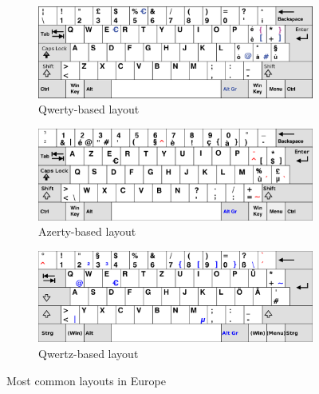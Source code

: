 \begin{figure}[H]
    \centering
    \begin{subfigure}[b]{0.3\textwidth}
        \includegraphics[width=\textwidth]{images/qwerty.png}
        \caption{Qwerty-based layout}
    \end{subfigure}
	 \begin{subfigure}[b]{0.3\textwidth}
        \includegraphics[width=\textwidth]{images/azerty.png}
        \caption{Azerty-based layout}
    \end{subfigure} 
    \begin{subfigure}[b]{0.3\textwidth}
        \includegraphics[width=\textwidth]{images/qwertz.png}
        \caption{Qwertz-based layout}
    \end{subfigure}
    \caption{Most common layouts in Europe}
\end{figure}

